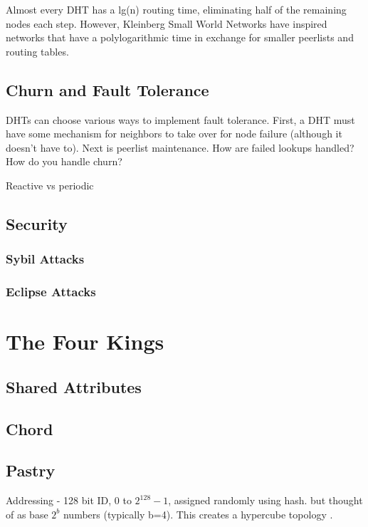 \documentclass[10pt,letterpaper]{report}
\begin{document}
Almost every DHT has a lg(n) routing time, eliminating  half of the remaining nodes each step.
However, Kleinberg Small World Networks have inspired networks that have a polylogarithmic time in exchange for smaller peerlists and routing tables.


\section{Churn and Fault Tolerance}  %

DHTs can choose various ways to implement fault tolerance.  First, a DHT must have some mechanism for neighbors to take over for node failure (although it doesn't have to).  Next is peerlist maintenance.  How are failed lookups handled?  How do you handle churn?

Reactive vs periodic

\section{Security}

\subsection{Sybil Attacks}

\subsection{Eclipse Attacks}

\chapter{The Four Kings}%

\section{Shared Attributes}

\section{Chord}

\section{Pastry}

Addressing - 128 bit ID, 0 to $2^128 -1$, assigned randomly using hash.   but thought of as base $2^b$ numbers (typically b=4).  This creates a hypercube topology \cite{induced}.
\end{document}
